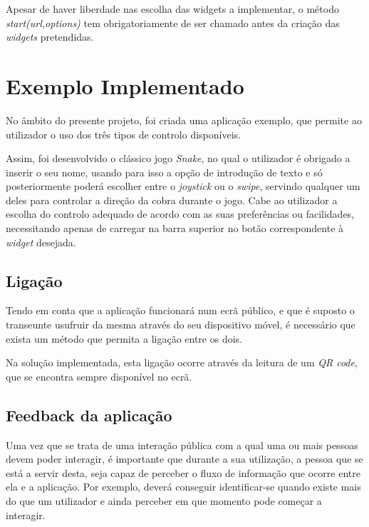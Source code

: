 	Apesar de haver liberdade nas escolha das widgets a implementar, o método \textit{start(url,options)} tem obrigatoriamente de ser chamado antes da criação das \textit{widgets} pretendidas. 


	
\section{Exemplo Implementado} \label{sec:exemplo}

	No âmbito do presente projeto, foi criada uma aplicação exemplo, que permite ao utilizador o uso dos três tipos de controlo disponíveis. 

	Assim, foi desenvolvido o clássico jogo \textit{Snake}, no qual o utilizador é obrigado a inserir o seu nome, usando para isso a opção de introdução de texto e só posteriormente poderá escolher entre o \textit{joystick} ou o \textit{swipe}, servindo qualquer um deles para controlar a direção da cobra durante o jogo. Cabe ao utilizador a escolha do controlo adequado de acordo com as suas preferências ou facilidades, necessitando apenas de carregar na barra superior no botão correspondente à \textit{widget} desejada.

	\subsection{Ligação}

	Tendo em conta que a aplicação funcionará num ecrã público, e que é suposto o transeunte usufruir da mesma através do seu dispositivo móvel, é necessário que exista um método que permita a ligação entre os dois.

	Na solução implementada, esta ligação ocorre através da leitura de um \textit{QR code}, que se encontra sempre disponível no ecrã.

	\subsection{Feedback da aplicação}

	Uma vez que se trata de uma interação pública com a qual uma ou mais pessoas devem poder interagir, é importante que durante a sua utilização, a pessoa que se está a servir desta, seja capaz de perceber o fluxo de informação que ocorre entre ela e a aplicação. Por exemplo, deverá conseguir identificar-se quando existe mais do que um utilizador e ainda perceber em que momento pode começar a interagir.

